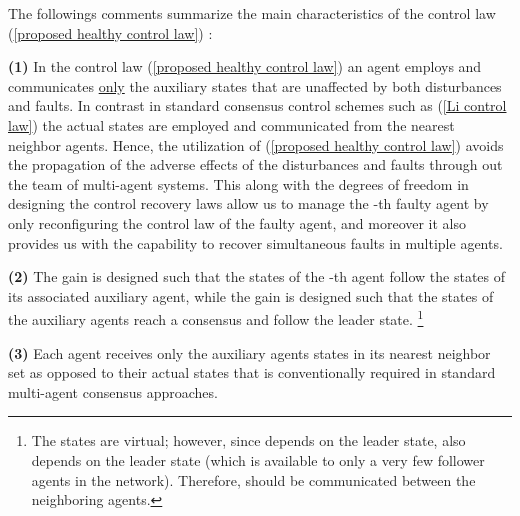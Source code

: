 \documentclass[12pt,draftcls,onecolumn]{IEEEtran}
\begin{document}
The followings comments summarize the main characteristics of  the control law (\ref{proposed healthy control law}) : 

\textbf{(1)} In the control law (\ref{proposed healthy control law}) an agent employs and communicates \underline{only} the auxiliary states  that are   unaffected by  both disturbances and  faults. 
In contrast  in standard consensus control schemes such as  (\ref{Li control law})  the actual states  are employed and communicated from the nearest neighbor agents.  
 Hence, the utilization of  (\ref{proposed healthy control law})   avoids the propagation of the adverse effects of the disturbances and faults  through out the team of multi-agent systems. This along with the degrees of freedom in designing the control recovery laws  allow us to manage the -th faulty agent by {only} reconfiguring the control law of the faulty agent, and moreover it also provides us with the capability to recover simultaneous faults in multiple agents. 
 
  \textbf{(2)} The gain  is designed such that the states of the -th agent follow the states of its associated auxiliary agent,  while the gain  is designed such that the states of the auxiliary agents reach a consensus and follow the leader state. 
\footnote{The states  are virtual; however, since  depends on the leader state,  also depends on the leader state  (which is  available to only a very few follower agents in the network). Therefore,  should be communicated between the neighboring agents.}  
\par
\textbf{(3)} Each agent receives only the auxiliary agents states in its nearest neighbor set as opposed to  their actual states 
 that is conventionally required in standard multi-agent consensus approaches. 
 
\end{document}
